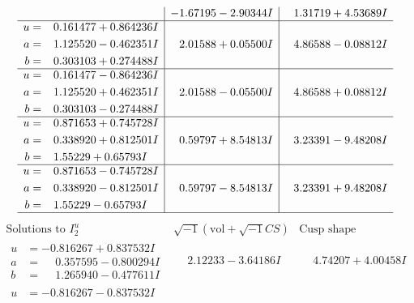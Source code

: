 \documentclass[1p]{elsarticle_modified}
\theoremstyle{definition}
\newcommand{\I}{\sqrt{-1}}
\begin{document}
$$\begin{array}{c|c|c}
 & -1.67195 - 2.90344 I & \phantom{-}1.31719 + 4.53689 I \\ \hline\begin{aligned}
u &= \phantom{-}0.161477 + 0.864236 I \\
a &= \phantom{-}1.125520 - 0.462351 I \\
b &= \phantom{-}0.303103 + 0.274488 I\end{aligned}
 & \phantom{-}2.01588 + 0.05500 I & \phantom{-}4.86588 - 0.08812 I \\ \hline\begin{aligned}
u &= \phantom{-}0.161477 - 0.864236 I \\
a &= \phantom{-}1.125520 + 0.462351 I \\
b &= \phantom{-}0.303103 - 0.274488 I\end{aligned}
 & \phantom{-}2.01588 - 0.05500 I & \phantom{-}4.86588 + 0.08812 I \\ \hline\begin{aligned}
u &= \phantom{-}0.871653 + 0.745728 I \\
a &= \phantom{-}0.338920 + 0.812501 I \\
b &= \phantom{-}1.55229 + 0.65793 I\end{aligned}
 & \phantom{-}0.59797 + 8.54813 I & \phantom{-}3.23391 - 9.48208 I \\ \hline\begin{aligned}
u &= \phantom{-}0.871653 - 0.745728 I \\
a &= \phantom{-}0.338920 - 0.812501 I \\
b &= \phantom{-}1.55229 - 0.65793 I\end{aligned}
 & \phantom{-}0.59797 - 8.54813 I & \phantom{-}3.23391 + 9.48208 I\\
 \hline 
 \end{array}$$\newpage$$\begin{array}{c|c|c}  
\text{Solutions to }I^u_{2}& \I (\text{vol} + \sqrt{-1}CS) & \text{Cusp shape}\\
 \hline 
\begin{aligned}
u &= -0.816267 + 0.837532 I \\
a &= \phantom{-}0.357595 - 0.800294 I \\
b &= \phantom{-}1.265940 - 0.477611 I\end{aligned}
 & \phantom{-}2.12233 - 3.64186 I & \phantom{-}4.74207 + 4.00458 I \\ \hline\begin{aligned}
u &= -0.816267 - 0.837532 I \\

\end{aligned}
\end{array}$$
\end{document}

